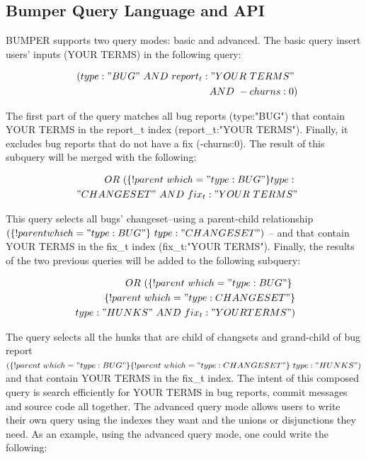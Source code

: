 \documentclass[conference]{IEEEtran}
\begin{document}
\subsection{Bumper Query Language and API}
\label{sub:Bumper Query Language and API}

BUMPER supports two query modes: basic and advanced.
The basic query insert users' inputs (YOUR TERMS) in the
following query:

\begin{equation}
\begin{split}
~~(type:"BUG"~AND~report_t:"YOUR~TERMS"~\\
~~AND~-churns:0)
\end{split}
\end{equation}



The first part of the query matches all bug reports
(type:"BUG") that contain YOUR TERMS in the report\_t index
(report\_t:"YOUR TERMS").
Finally, it excludes bug reports that
do not have a fix (-churns:0).
The result of this subquery will be
merged with the following:

\begin{equation}
\begin{split}
~~OR~(\{!parent~which="type:BUG"\}type:~\\
~~"CHANGESET"~AND~fix_t:"YOUR~TERMS"
\end{split}
\end{equation}

This query selects all bugs' changeset--using a parent-child
relationship $(\{!parent which="type:BUG"\}~type:
  "CHANGESET")$ -- and that contain YOUR TERMS in the fix\_t
  index (fix\_t:"YOUR TERMS").
Finally, the results of the two
previous queries will be added to the following subquery:

\begin{equation}
\begin{split}
  OR~(\{!parent~which="type:BUG"\}\ \\
~\{!parent~which="type:CHANGESET"\}\\
~type:"HUNKS"~AND~fix_t:"YOUR TERMS")
\end{split}
\end{equation}

The query selects all the hunks that are child of changsets and
grand-child of bug report $ (\{!parent~which="type:BUG"\}
  \{!parent~which="type:CHANGESET"\}~type:"HUNKS")$
and that
contain YOUR TERMS in the fix\_t index.
The intent of this composed query is search efficiently for
YOUR TERMS in bug reports, commit messages and source
code all together.
The advanced query mode allows users to write their own
query using the indexes they want and the unions or disjunctions
they need.
As an example, using the advanced query mode, one
could write the following:
\end{document}
